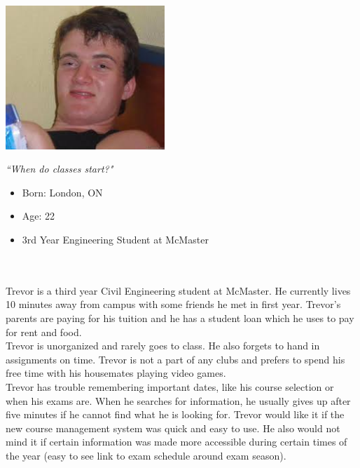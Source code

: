 \documentclass[10pt]{article}
\begin{document}
\begin{minipage}{60mm}
\includegraphics[width=60mm]{Trevor.jpg}
\begin{center}
\emph{``When do classes start?"}
\end{center}
\end{minipage}
\begin{minipage}{\textwidth}
\begin{itemize}
\item Born: London, ON
\item Age: 22
\item 3rd Year Engineering Student at McMaster
\end{itemize}
\end{minipage}\\\\

Trevor is a third year Civil Engineering student at McMaster. He currently lives 10 minutes away from campus with some friends he met in first year. Trevor's parents are paying for his tuition and he has a student loan which he uses to pay for rent and food.\\

Trevor is unorganized and rarely goes to class. He also forgets to hand in assignments on time. Trevor is not a part of any clubs and prefers to spend his free time with his housemates playing video games.\\

Trevor has trouble remembering important dates, like his course selection or when his exams are. When he searches for information, he usually gives up after five minutes if he cannot find what he is looking for. Trevor would like it if the new course management system was quick and easy to use. He also would not mind it if certain information was made more accessible during certain times of the year (easy to see link to exam schedule around exam season).

\newpage
\end{document}
